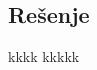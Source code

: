\documentclass[a4paper,12pt]{report}
\begin{document}

\subsection*{Re\v{s}enje}






\begin{thebibliography}{9}
 kkkk
 kkkkk

\end{thebibliography}
\end{document}
